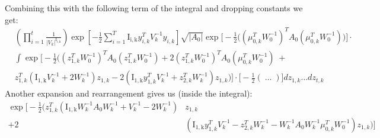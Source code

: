\documentclass{standalone}
\newcommand{\yik}[1]{y_{#1, k}}
\newcommand{\zik}[1]{z_{#1, k}}
\newcommand{\mik}[1]{\mu_{#1, k}}
\newcommand{\vk}{V_k}
\newcommand{\Ik}[1]{\operatorname{I_{#1, k}}}
\newcommand{\ivk}[1]{V_{#1}^{-1}}
\newcommand{\iwk}[1]{W_{#1}^{-1}}
\DeclareMathOperator{\lint}{\displaystyle\int}
\DeclareMathOperator{\lprod}{\displaystyle\prod}
\begin{document}
Combining this with the following term of the integral and dropping constants we get:
\begin{align}
\label{eq:exp_int}
&\left( \lprod_{i = 1}^t \frac{1}{|\vk|^{\Ik{i}}} \right) \exp \left[-\frac{1}{2} \sum_{i = 1}^T \Ik{i} \yik{i}^T \ivk{k} \yik{i} \right] \sqrt{|A_0|} \exp\bigg[-\frac{1}{2} \bigg(\left(\mik{0}^T\iwk{0} \right)^T A_0 \left(\mik{0}^T\iwk{0} \right) \bigg) \bigg] \cdot \nonumber \\ 
 & \lint \exp \bigg[ -\frac{1}{2} \bigg( \left( \zik{1}^T \iwk{0} \right)^T A_0 \left(\zik{1}^T \iwk{0} \right) + 2 \left(\zik{1}^T \iwk{0} \right)^T A_0 \left(\mik{0}^T\iwk{0} \right)\; + \nonumber \\
& \zik{1}^T \left(\Ik{1} \ivk{k} + 2 \iwk{k} \right) \zik{1} - 2 \left(\Ik{1} \yik{1}^T \ivk{k} + \zik{2}^T \iwk{k} \right) \zik{1} \bigg) \bigg] \cdot \bigg[-\frac{1}{2} \left(\; \dots \; \right) \bigg] d\zik{1} \dots d\zik{t} 
\end{align}
Another expansion and rearrangement gives us (inside the integral):
\begin{align}
\label{eq:exp_iter}
\exp \bigg[ -\frac{1}{2} \bigg( \zik{1}^T \left(\Ik{1} \iwk{k}A_0 \iwk{k} + \ivk{k} - 2 \iwk{k} \right) & \zik{1}  \nonumber \\ 
 + 2 & \left(\Ik{1} \yik{1}^T \ivk{k} - \zik{2}^T \iwk{k} - \iwk{k}A_0\iwk{k}\mik{0}^T \iwk{0} \right) \zik{1} \bigg) \bigg]
\end{align}
\end{document}
